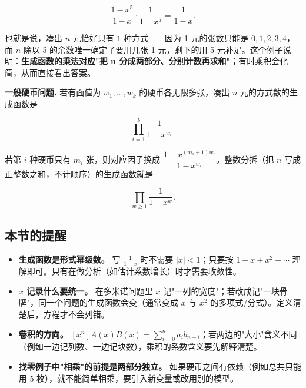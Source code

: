 \[
\frac{1-x^5}{1-x}\cdot\frac{1}{1-x^5}=\frac{1}{1-x}.
\]

也就是说，凑出 $n$ 元恰好只有 $1$ 种方式——因为 1 元的张数只能是 $0,1,2,3,4$，而 $n$ 除以 5 的余数唯一确定了要用几张 1 元，剩下的用 5 元补足。这个例子说明：\textbf{生成函数的乘法对应"把 n 分成两部分、分别计数再求和"}；有时乘积会化简，从而直接看出答案。

\textbf{一般硬币问题.} 若有面值为 $w_1,\dots,w_k$ 的硬币各无限多张，凑出 $n$ 元的方式数的生成函数是

\[
\prod_{i=1}^{k}\frac{1}{1-x^{w_i}}.
\]

若第 $i$ 种硬币只有 $m_i$ 张，则对应因子换成 $\dfrac{1-x^{(m_i+1)w_i}}{1-x^{w_i}}$。整数分拆（把 $n$ 写成正整数之和，不计顺序）的生成函数就是

\[
\prod_{w\ge1}\frac{1}{1-x^w}.
\]

\subsection{本节的提醒}


\begin{itemize}
\item \textbf{生成函数是形式幂级数。} 写 $\frac{1}{1-x}$ 时不需要 $|x|<1$；只要按 $1+x+x^2+\cdots$ 理解即可。只有在做分析（如估计系数增长）时才需要收敛性。
\item \textbf{$x$ 记录什么要统一。} 在多米诺问题里 $x$ 记"一列的宽度"；若改成记"一块骨牌"，同一个问题的生成函数会变（通常变成 $x$ 与 $x^2$ 的多项式/分式）。定义清楚后，方程才不会列错。
\item \textbf{卷积的方向。} $[x^n]A(x)B(x)=\sum_{i=0}^na_ib_{n-i}$；若两边的"大小"含义不同（例如一边记列数、一边记块数），乘积的系数含义要先解释清楚。
\item \textbf{找零例子中"相乘"的前提是两部分独立。} 如果硬币之间有依赖（例如总共只能用 5 枚），就不能简单相乘，要引入新变量或改用别的模型。
\end{itemize}
